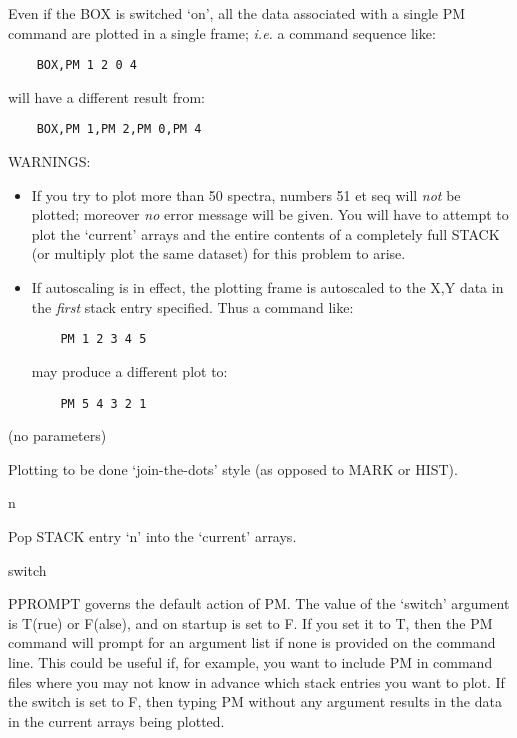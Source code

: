 \begin {description}
Even if the BOX is switched `on', all the data associated with a single PM
command are plotted in a single frame; {\em i.e.} a command sequence like:

\begin{verbatim}
    BOX,PM 1 2 0 4
\end{verbatim}

will have a different result from:

\begin{verbatim}
    BOX,PM 1,PM 2,PM 0,PM 4
\end{verbatim}

WARNINGS:

\begin{itemize}

\item If you try to plot more than 50 spectra, numbers 51 et seq will
{\em not} be plotted; moreover {\em no} error message will be given.
You will have to attempt to plot the `current' arrays and the entire
contents of a completely full STACK (or multiply plot the same
dataset) for this problem to arise.

\item If autoscaling is in effect, the plotting frame is autoscaled to
the X,Y data in the {\em first} stack entry specified. Thus a command
like:

\begin{verbatim}
    PM 1 2 3 4 5
\end{verbatim}

may produce a different plot to:

\begin{verbatim}
    PM 5 4 3 2 1
\end{verbatim}

\end{itemize}

\item [POLY] (no parameters)

Plotting to be done `join-the-dots' style (as opposed to MARK or HIST).

\item [POP] n

Pop STACK entry `n' into the `current' arrays.

\item [PPROMPT] switch

PPROMPT governs the default action of PM. The value of the `switch'
argument is T(rue) or F(alse), and on startup is set to F. If you set
it to T, then the PM command will prompt for an argument list if none
is provided on the command line. This could be useful if, for example,
you want to include PM in command files where you may not know in
advance which stack entries you want to plot. If the switch is set to
F, then typing PM without any argument results in the data in the
current arrays being plotted.


\end{description}
